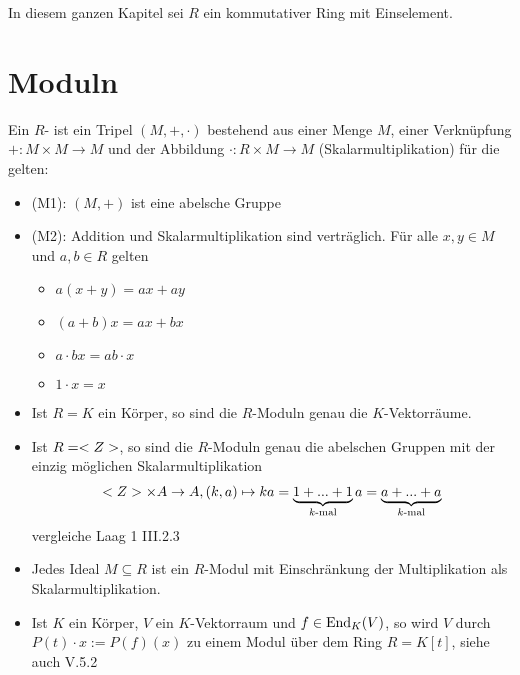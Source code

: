 In diesem ganzen Kapitel sei $R$ ein kommutativer Ring mit Einselement.

\section{Moduln}

\begin{definition}
	Ein $R$- ist ein Tripel $(M,+,\cdot)$ bestehend aus einer Menge $M$, einer Verknüpfung $+:M\times M\to M$ und der Abbildung $\cdot:R\times M\to M$ (Skalarmultiplikation) für die gelten:
	\begin{itemize}
		\item (M1): $(M,+)$ ist eine abelsche Gruppe
		\item (M2): Addition und Skalarmultiplikation sind verträglich. Für alle $x,y\in M$ und $a,b\in R$ gelten
		\begin{itemize}
			\item $a(x+y)=ax+ay$
			\item $(a+b)x=ax+bx$
			\item $a\cdot bx=ab\cdot x$
			\item $1\cdot x=x$
		\end{itemize}
	\end{itemize}
\end{definition}

\begin{example}
	\begin{itemize}
		\item Ist $R=K$ ein Körper, so sind die $R$-Moduln genau die $K$-Vektorräume.
		\item Ist $R=<Z>$, so sind die $R$-Moduln genau die abelschen Gruppen mit der einzig möglichen Skalarmultiplikation 
		\begin{align}
			<Z>\times A\to A,(k,a)\mapsto ka=\underbrace{1+...+1}_{k\text{-mal}}a=\underbrace{a+...+a}_{k\text{-mal}}\notag
		\end{align}
		vergleiche Laag 1 III.2.3 %
		\item Jedes Ideal $M\subseteq R$ ist ein $R$-Modul mit Einschränkung der Multiplikation als Skalarmultiplikation.
		\item Ist $K$ ein Körper, $V$ ein $K$-Vektorraum und $f\in\operatorname{End}_K(V)$, so wird $V$ durch $P(t)\cdot x:=P(f)(x)$ zu einem Modul über dem Ring $R=K[t]$, siehe auch V.5.2 %
	\end{itemize}
\end{example}

